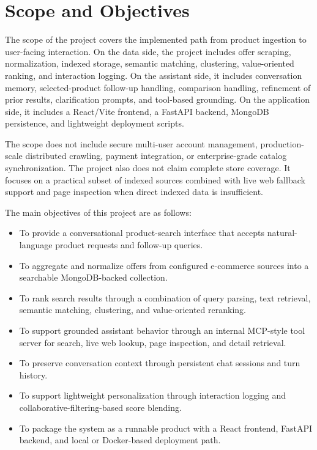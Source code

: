 \documentclass[12pt,a4paper,oneside]{report}
\begin{document}
\section{Scope and Objectives}
The scope of the project covers the implemented path from product ingestion to user-facing interaction. On the data side, the project includes offer scraping, normalization, indexed storage, semantic matching, clustering, value-oriented ranking, and interaction logging. On the assistant side, it includes conversation memory, selected-product follow-up handling, comparison handling, refinement of prior results, clarification prompts, and tool-based grounding. On the application side, it includes a React/Vite frontend, a FastAPI backend, MongoDB persistence, and lightweight deployment scripts.

The scope does not include secure multi-user account management, production-scale distributed crawling, payment integration, or enterprise-grade catalog synchronization. The project also does not claim complete store coverage. It focuses on a practical subset of indexed sources combined with live web fallback support and page inspection when direct indexed data is insufficient.

The main objectives of this project are as follows:
\begin{itemize}[leftmargin=0.35in]
    \item To provide a conversational product-search interface that accepts natural-language product requests and follow-up queries.
    \item To aggregate and normalize offers from configured e-commerce sources into a searchable MongoDB-backed collection.
    \item To rank search results through a combination of query parsing, text retrieval, semantic matching, clustering, and value-oriented reranking.
    \item To support grounded assistant behavior through an internal MCP-style tool server for search, live web lookup, page inspection, and detail retrieval.
    \item To preserve conversation context through persistent chat sessions and turn history.
    \item To support lightweight personalization through interaction logging and collaborative-filtering-based score blending.
    \item To package the system as a runnable product with a React frontend, FastAPI backend, and local or Docker-based deployment path.
\end{itemize}
\end{document}
